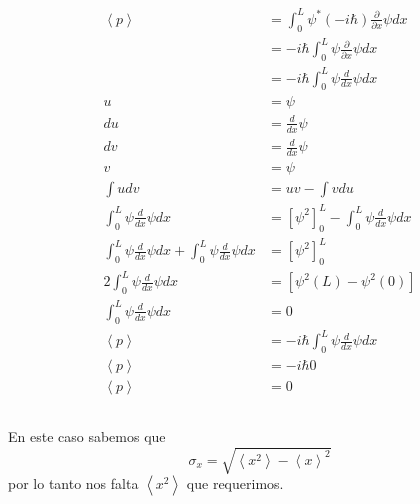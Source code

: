 \documentclass{report}
\begin{document}
\subsection{}

\begin{align*}
  \left< p \right> &= \int_0^L \psi^* (-i \hbar) \frac{\partial }{\partial x} \psi dx \\
  &= -i \hbar\int_0^L \psi \frac{\partial }{\partial x} \psi dx \\
  &= -i \hbar\int_0^L \psi \frac{d }{dx} \psi dx \\
  u &= \psi\\
  du &= \frac{d}{dx} \psi \\
  dv &= \frac{d}{dx} \psi\\
  v &= \psi\\
  \int udv &= uv - \int vdu\\
  \int_0^L \psi \frac{d }{d x} \psi dx &= \left[\psi^2\right]_0^L - \int_0^L \psi \frac{d}{dx}\psi dx\\
  \int_0^L \psi \frac{d }{d x} \psi dx + \int_0^L \psi \frac{d}{dx}\psi dx &= \left[\psi^2\right]_0^L\\
  2 \int_0^L \psi \frac{d }{d x} \psi dx &= \left[\psi^2(L) - \psi^2(0)\right]\\
  \int_0^L \psi \frac{d }{d x} \psi dx &= 0\\
  \left< p \right> &= -i \hbar\int_0^L \psi \frac{d }{dx} \psi dx \\
  \left< p \right> &= -i \hbar 0\\
  \left< p \right> &= 0
\end{align*}

\subsection{}

En este caso sabemos que \[\sigma_x = \sqrt{\left<x^2\right> - \left<x\right>^2}\] por lo tanto nos falta $\left< x^2 \right>$ que requerimos.
\end{document}
